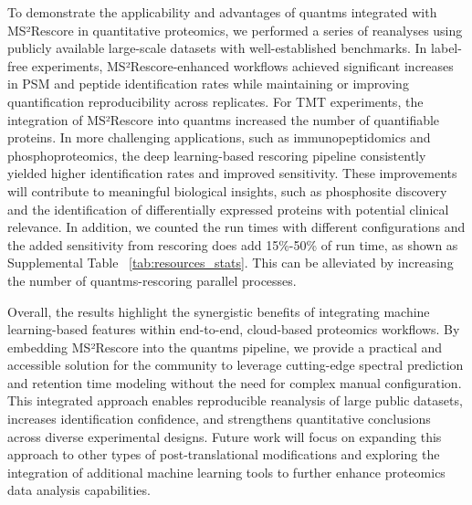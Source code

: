 \documentclass[12pt]{article}
\begin{document}
To demonstrate the applicability and advantages of quantms integrated with MS²Rescore in quantitative proteomics, we performed a series of reanalyses using publicly available large-scale datasets with well-established benchmarks. In label-free experiments, MS²Rescore-enhanced workflows achieved significant increases in PSM and peptide identification rates while maintaining or improving quantification reproducibility across replicates. For TMT experiments, the integration of MS²Rescore into quantms increased the number of quantifiable proteins. In more challenging applications, such as immunopeptidomics and phosphoproteomics, the deep learning-based rescoring pipeline consistently yielded higher identification rates and improved sensitivity. %
These improvements will contribute to meaningful biological insights, such as phosphosite discovery and the identification of differentially expressed proteins with potential clinical relevance. In addition, we counted the run times with different configurations and the added sensitivity from rescoring does add 15\%-50\% of run time, as shown as Supplemental Table ~\ref{tab:resources_stats}. %
This can be alleviated by increasing the number of quantms-rescoring parallel processes. %

Overall, the results highlight the synergistic benefits of integrating machine learning-based features within end-to-end, cloud-based proteomics workflows. By embedding MS²Rescore into the quantms pipeline, we provide a practical and accessible solution for the community to leverage cutting-edge spectral prediction and retention time modeling without the need for complex manual configuration. This integrated approach enables reproducible reanalysis of large public datasets, increases identification confidence, and strengthens quantitative conclusions across diverse experimental designs. Future work will focus on expanding this approach to other types of post-translational modifications and exploring the integration of additional machine learning tools to further enhance proteomics data analysis capabilities. %
\end{document}
